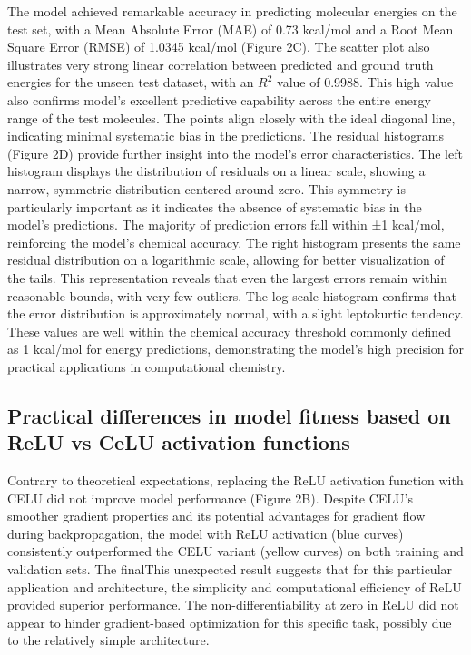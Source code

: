 \documentclass[11pt, twocolumn]{article}
\begin{document}
The model achieved remarkable accuracy in predicting molecular energies on the test set, with a Mean Absolute Error (MAE) of 0.73 kcal/mol and a Root Mean Square Error (RMSE) of 1.0345 kcal/mol (Figure 2C). The scatter plot also illustrates very strong linear correlation between predicted and ground truth energies for the unseen test dataset, with an $R^2$ value of 0.9988. This high value also confirms model's excellent predictive capability across the entire energy range of the test molecules. The points align closely with the ideal diagonal line, indicating minimal systematic bias in the predictions. The residual histograms (Figure 2D) provide further insight into the model's error characteristics. The left histogram displays the distribution of residuals on a linear scale, showing a narrow, symmetric distribution centered around zero. This symmetry is particularly important as it indicates the absence of systematic bias in the model's predictions. The majority of prediction errors fall within ±1 kcal/mol, reinforcing the model's chemical accuracy. The right histogram presents the same residual distribution on a logarithmic scale, allowing for better visualization of the tails. This representation reveals that even the largest errors remain within reasonable bounds, with very few outliers. The log-scale histogram confirms that the error distribution is approximately normal, with a slight leptokurtic tendency. These values are well within the chemical accuracy threshold commonly defined as 1 kcal/mol for energy predictions, \cite{bogojeski2020quantum} demonstrating the model's high precision for practical applications in computational chemistry.

\subsection{Practical differences in model fitness based on ReLU vs CeLU activation functions}
Contrary to theoretical expectations, replacing the ReLU activation function with CELU did not improve model performance (Figure 2B). Despite CELU's smoother gradient properties and its potential advantages for gradient flow during backpropagation, the model with ReLU activation (blue curves) consistently outperformed the CELU variant (yellow curves) on both training and validation sets. The finalThis unexpected result suggests that for this particular application and architecture, the simplicity and computational efficiency of ReLU provided superior performance. The non-differentiability at zero in ReLU did not appear to hinder gradient-based optimization for this specific task, possibly due to the relatively simple architecture.
\end{document}
